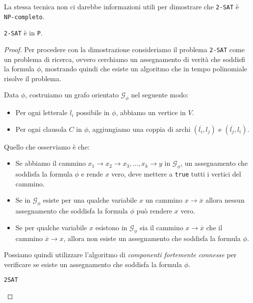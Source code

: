 La stessa tecnica non ci darebbe informazioni utili per dimostrare che \texttt{2-SAT}
è \texttt{NP-completo}. 

\begin{theorem}
    \texttt{2-SAT} è in \texttt{P}.
\end{theorem}
\begin{proof}
    Per procedere con la dimostrazione consideriamo il problema \texttt{2-SAT} come un problema di ricerca, ovvero cerchiamo un assegnamento di verità che soddisfi la formula $\phi$, mostrando quindi che esiste un algoritmo che in tempo polinomiale risolve il problema.
    
    Data $\phi$, costruiamo un grafo orientato $\mathcal{G}_\phi$ nel seguente modo:
    \begin{itemize}
        \item Per ogni letterale $l_i$ possibile in $\phi$, abbiamo un vertice in $V$.
        \item Per ogni clausola $C$ in $\phi$, aggiungiamo una coppia di archi $(\overline{l_i}, l_j)$ e $(\overline{l_j}, l_i)$.
    \end{itemize}
    Quello che osserviamo è che:
    \begin{itemize}
        \item Se abbiamo il cammino $x_1 \rightarrow x_2 \rightarrow x_3, \dots, x_k \rightarrow y$ in $\mathcal{G}_\phi$,
        un assegnamento che soddisfa la formula $\phi$ e rende $x$ vero, deve mettere a \texttt{true}
        tutti i vertici del cammino.
        \item Se in $\mathcal{G}_\phi$ esiste per una qualche variabile $x$ un cammino $x \rightarrow \overline{x}$
        allora nessun assegnamento che soddisfa la formula $\phi$ può rendere $x$ vero.
        \item Se per qualche variabile $x$ esistono in $\mathcal{G}_\phi$ sia il cammino $x \rightarrow \overline{x}$
        che il cammino $\overline{x} \rightarrow x$, allora non esiste un assegnamento che soddisfa la formula $\phi$.
    \end{itemize}
    Possiamo quindi utilizzare l'algoritmo di \textit{componenti fortemente connesse} per verificare
    se esiste un assegnamento che soddisfa la formula $\phi$.
    
    \begin{algorithm}[H]
        \caption{\texttt{2SAT}}
        \DontPrintSemicolon 
        
        

\end{algorithm}
\end{proof}
